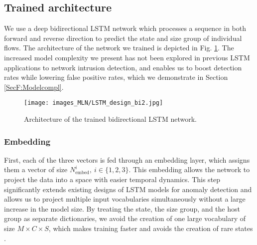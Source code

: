 \subsection{Trained architecture}


We use a deep bidirectional LSTM network which processes a sequence in both forward and reverse direction to predict the state and size group of individual flows.
The architecture of the network we trained is depicted in Fig. \ref{figF:rnn_FSA}. The increased model complexity we present has not been explored in previous LSTM applications to network intrusion detection, and enables us to boost detection rates while lowering false positive rates, which we demonstrate in Section \ref{SecF:Modelcompl}.
\begin{figure}
    \begin{center}
      \texttt{[image: images\_MLN/LSTM\_design\_bi2.jpg]}
    \end{center}
    \vspace{-15pt}
    \caption{Architecture of the trained bidirectional LSTM network. }\label{figF:rnn_FSA}
\end{figure}

\subsubsection{Embedding}
First, each of the three vectors is fed through an embedding layer, which assigns them a vector of size $N^i_{\text{embed}}, ~i\in\{1,2,3\}$. This embedding allows the network to project the data into a space with easier temporal dynamics. This step significantly extends existing designs of LSTM models for anomaly detection and allows us to project multiple input vocabularies simultaneously without a large increase in the model size. 
By treating the state, the size group, and the host group as separate dictionaries, we avoid the creation of one large vocabulary of size $M\times C \times S$, which makes training faster and avoids the creation of rare states \cite{chen2015strategies}. 

